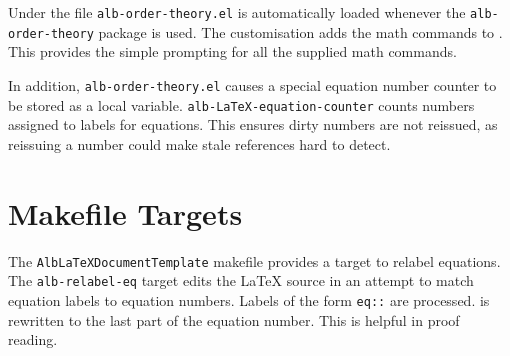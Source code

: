 \documentclass[11pt,a4paper,oneside]{alb-latex}
\begin{document}
Under \AUCTeX{} the file \texttt{alb-order-theory.el} is automatically
loaded whenever the \texttt{alb-order-theory} package is used.  The
customisation adds the math commands to \AUCTeX{}.  This provides the
simple prompting for all the supplied math commands.

In addition, \texttt{alb-order-theory.el} causes a special equation
number counter to be stored as a local variable.
\texttt{alb-LaTeX-equation-counter} counts numbers assigned to labels
for equations.  This ensures dirty numbers are not reissued, as
reissuing a number could make stale references hard to detect.




\section{Makefile Targets}
\label{sec:alb-order-theory-documentation:makef-targ}

The \texttt{AlbLaTeXDocumentTemplate} makefile provides a target to
relabel equations.  The \texttt{alb-relabel-eq} target edits the
\LaTeX{} source in an attempt to match equation labels to equation
numbers.  Labels of the form
\texttt{eq:}\texttt{:} are
processed.   is rewritten to the last part of the
equation number.  This is helpful in proof reading.
\end{document}
